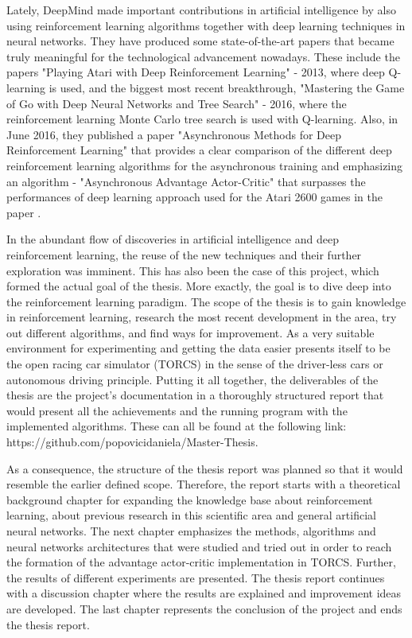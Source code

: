 Lately, DeepMind made important contributions in artificial intelligence by also using reinforcement learning algorithms together with deep learning techniques in neural networks. They have produced some state-of-the-art papers that became truly meaningful for the technological advancement nowadays. These include the papers "Playing Atari with Deep Reinforcement Learning" \cite{DBLP:journals/corr/MnihKSGAWR13} - 2013, where deep Q-learning is used, and the biggest most recent breakthrough, "Mastering the Game of Go with Deep Neural Networks and Tree Search" \cite{Silver_2016} - 2016, where the reinforcement learning Monte Carlo tree search is used with Q-learning. Also, in June 2016, they published a paper "Asynchronous Methods for Deep Reinforcement Learning" \cite{DBLP:journals/corr/MnihBMGLHSK16} that provides a clear comparison of the different deep reinforcement learning algorithms for the asynchronous training and emphasizing an algorithm - "Asynchronous Advantage Actor-Critic" that surpasses the performances of deep learning approach used for the Atari 2600 games in the paper \cite{DBLP:journals/corr/MnihKSGAWR13}.

In the abundant flow of discoveries in artificial intelligence and deep reinforcement learning, the reuse of the new techniques and their further exploration was imminent. This has also been the case of this project, which formed the actual goal of the thesis. More exactly, the goal is to dive deep into the reinforcement learning paradigm. The scope of the thesis is to gain knowledge in reinforcement learning, research the most recent development in the area, try out different algorithms, and find ways for improvement. As a very suitable environment for experimenting and getting the data easier presents itself to be the open racing car simulator (TORCS) in the sense of the driver-less cars or autonomous driving principle. Putting it all together, the deliverables of the thesis are the project's documentation in a thoroughly structured report that would present all the achievements and the running program with the implemented algorithms. These can all be found at the following link: https://github.com/popovicidaniela/Master-Thesis.

As a consequence, the structure of the thesis report was planned so that it would resemble the earlier defined scope. Therefore, the report starts with a theoretical background chapter for expanding the knowledge base about reinforcement learning, about previous research in this scientific area and general artificial neural networks. The next chapter emphasizes the methods, algorithms and neural networks architectures that were studied and tried out in order to reach the formation of the advantage actor-critic implementation in TORCS. Further, the results of different experiments are presented. The thesis report continues with a discussion chapter where the results are explained and improvement ideas are developed. The last chapter represents the conclusion of the project and ends the thesis report.